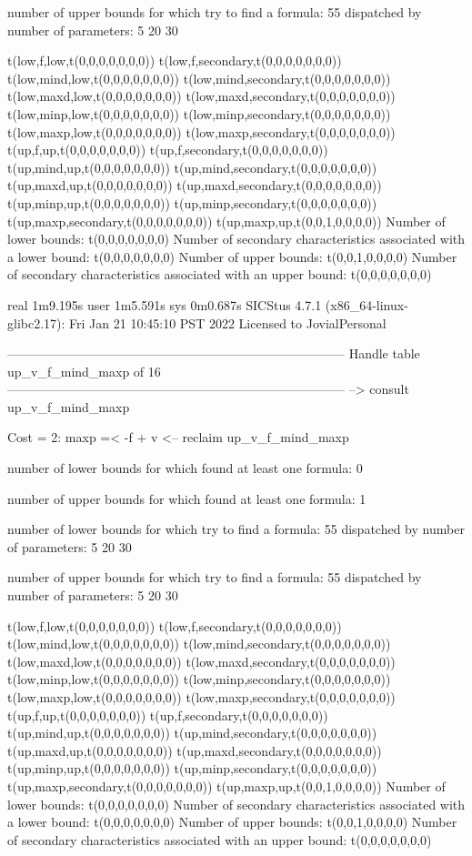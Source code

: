 number of upper bounds for which try to find a formula: 55
dispatched by number of parameters: 5  20  30

t(low,f,low,t(0,0,0,0,0,0,0))
t(low,f,secondary,t(0,0,0,0,0,0,0))
t(low,mind,low,t(0,0,0,0,0,0,0))
t(low,mind,secondary,t(0,0,0,0,0,0,0))
t(low,maxd,low,t(0,0,0,0,0,0,0))
t(low,maxd,secondary,t(0,0,0,0,0,0,0))
t(low,minp,low,t(0,0,0,0,0,0,0))
t(low,minp,secondary,t(0,0,0,0,0,0,0))
t(low,maxp,low,t(0,0,0,0,0,0,0))
t(low,maxp,secondary,t(0,0,0,0,0,0,0))
t(up,f,up,t(0,0,0,0,0,0,0))
t(up,f,secondary,t(0,0,0,0,0,0,0))
t(up,mind,up,t(0,0,0,0,0,0,0))
t(up,mind,secondary,t(0,0,0,0,0,0,0))
t(up,maxd,up,t(0,0,0,0,0,0,0))
t(up,maxd,secondary,t(0,0,0,0,0,0,0))
t(up,minp,up,t(0,0,0,0,0,0,0))
t(up,minp,secondary,t(0,0,0,0,0,0,0))
t(up,maxp,secondary,t(0,0,0,0,0,0,0))
t(up,maxp,up,t(0,0,1,0,0,0,0))
Number of lower bounds:                                             t(0,0,0,0,0,0,0)
Number of secondary characteristics associated with a lower bound:  t(0,0,0,0,0,0,0)
Number of upper bounds:                                             t(0,0,1,0,0,0,0)
Number of secondary characteristics associated with an upper bound: t(0,0,0,0,0,0,0)

real	1m9.195s
user	1m5.591s
sys	0m0.687s
SICStus 4.7.1 (x86_64-linux-glibc2.17): Fri Jan 21 10:45:10 PST 2022
Licensed to JovialPersonal


--------------------------------------------------------------------------------
Handle table up_v_f_mind_maxp of 16
--------------------------------------------------------------------------------
--> consult up_v_f_mind_maxp

Cost =  2:  maxp =< -f + v
<-- reclaim up_v_f_mind_maxp

number of lower bounds for which found at least one formula: 0

number of upper bounds for which found at least one formula: 1

number of lower bounds for which try to find a formula: 55
dispatched by number of parameters: 5  20  30

number of upper bounds for which try to find a formula: 55
dispatched by number of parameters: 5  20  30

t(low,f,low,t(0,0,0,0,0,0,0))
t(low,f,secondary,t(0,0,0,0,0,0,0))
t(low,mind,low,t(0,0,0,0,0,0,0))
t(low,mind,secondary,t(0,0,0,0,0,0,0))
t(low,maxd,low,t(0,0,0,0,0,0,0))
t(low,maxd,secondary,t(0,0,0,0,0,0,0))
t(low,minp,low,t(0,0,0,0,0,0,0))
t(low,minp,secondary,t(0,0,0,0,0,0,0))
t(low,maxp,low,t(0,0,0,0,0,0,0))
t(low,maxp,secondary,t(0,0,0,0,0,0,0))
t(up,f,up,t(0,0,0,0,0,0,0))
t(up,f,secondary,t(0,0,0,0,0,0,0))
t(up,mind,up,t(0,0,0,0,0,0,0))
t(up,mind,secondary,t(0,0,0,0,0,0,0))
t(up,maxd,up,t(0,0,0,0,0,0,0))
t(up,maxd,secondary,t(0,0,0,0,0,0,0))
t(up,minp,up,t(0,0,0,0,0,0,0))
t(up,minp,secondary,t(0,0,0,0,0,0,0))
t(up,maxp,secondary,t(0,0,0,0,0,0,0))
t(up,maxp,up,t(0,0,1,0,0,0,0))
Number of lower bounds:                                             t(0,0,0,0,0,0,0)
Number of secondary characteristics associated with a lower bound:  t(0,0,0,0,0,0,0)
Number of upper bounds:                                             t(0,0,1,0,0,0,0)
Number of secondary characteristics associated with an upper bound: t(0,0,0,0,0,0,0)

